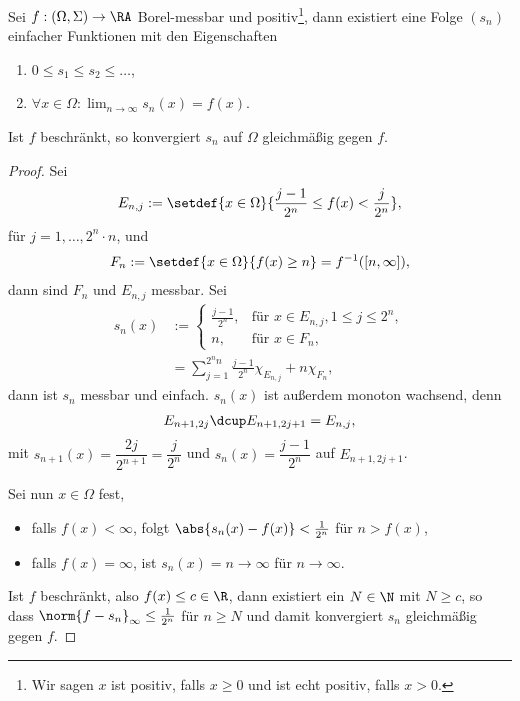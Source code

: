 \begin{prop}
\label{prop:3.27}
Sei $f: (\Omega,\Sigma)\to\RA$ Borel-messbar und positiv\footnote{Wir sagen $x$
ist positiv, falls $x\ge 0$ und ist echt positiv, falls $x > 0$.}, dann
existiert eine Folge $(s_n)$ einfacher Funktionen mit den Eigenschaften
\begin{enumerate}[label=(\roman{*})]
  \item $0\le s_1\le s_2\le \ldots$,
  \item $\forall x\in\Omega: \lim_{n\to\infty} s_n(x) = f(x)$.
\end{enumerate}
Ist $f$ beschränkt, so konvergiert $s_n$ auf $\Omega$ gleichmäßig gegen
$f$.\fishhere
\end{prop}
\begin{proof}
Sei
\begin{align*}
E_{n,j} := \setdef{x\in\Omega}{\frac{j-1}{2^n}\le f(x)< \frac{j}{2^n}},
\end{align*}
für $j=1,\ldots,2^n\cdot n$, und
\begin{align*}
F_n := \setdef{x\in\Omega}{f(x)\ge n} = f^{-1}([n,\infty]),
\end{align*}
dann sind $F_n$ und $E_{n,j}$ messbar. Sei
\begin{align*}
s_n(x) &:= \begin{cases}
          \frac{j-1}{2^n}, & \text{für } x\in E_{n,j}, 1\le j\le 2^n,\\
          n, & \text{für } x\in F_n,
          \end{cases}\\
&= \sum\limits_{j=1}^{2^nn} \frac{j-1}{2^n}\chi_{E_{n,j}} + n\chi_{F_n},
\end{align*}
dann ist $s_n$ messbar und einfach. $s_n(x)$ ist außerdem monoton wachsend, denn
\begin{align*}
E_{n+1,2j} \dcup E_{n+1,2j+1} = E_{n,j},
\end{align*}
mit $s_{n+1}(x) = \dfrac{2j}{2^{n+1}} =
\dfrac{j}{2^n}$ und $s_n(x) = \dfrac{j-1}{2^n}$ auf $E_{n+1,2j+1}$.

Sei nun $x\in\Omega$ fest,
\begin{itemize}
\item falls $f(x) <\infty$, folgt $\abs{s_n(x) - f(x)} < \frac{1}{2^n}$ für 
$n>f(x)$,
\item falls $f(x) = \infty$, ist $s_n(x) = n\to\infty$ für $n\to\infty$.
\end{itemize}

Ist $f$ beschränkt, also $f(x) \le c\in\R$, dann existiert ein $N\in\N$ mit
$N\ge c$, so dass $\norm{f-s_n}_\infty\le \frac{1}{2^n}$ für $n\ge N$ und damit
konvergiert $s_n$ gleichmäßig gegen $f$.\qedhere
\end{proof}

